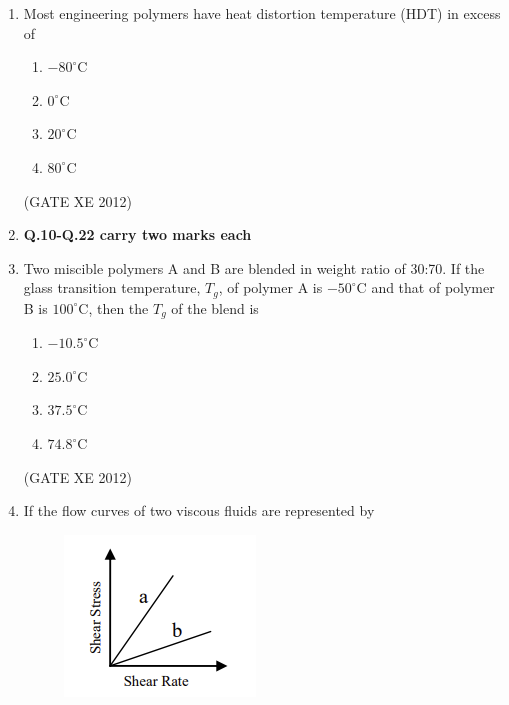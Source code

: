 \documentclass[12pt]{article}
\begin{document}
\begin{enumerate}
\item Most engineering polymers have heat distortion temperature (HDT) in excess of
\begin{multicols}{4}
\begin{enumerate}
\item $-80^\circ$C
\item $0^\circ$C
\item $20^\circ$C
\item $80^\circ$C
\end{enumerate}
\end{multicols}
(GATE XE 2012)

\item[] \textbf{Q.10-Q.22 carry two marks each}

\item Two miscible polymers A and B are blended in weight ratio of 30:70. If the glass transition temperature, $T_g$, of polymer A is $-50^\circ$C and that of polymer B is $100^\circ$C, then the $T_g$ of the blend is
\begin{multicols}{4}
\begin{enumerate}
\item $-10.5^\circ$C
\item $25.0^\circ$C
\item $37.5^\circ$C
\item $74.8^\circ$C
\end{enumerate}
\end{multicols}
(GATE XE 2012)


\item If the flow curves of two viscous fluids are represented by

\begin{figure}[H]
    \centering
    \includegraphics[width=0.5\columnwidth]{figs/ass2_f_q11.png}
    \caption{}
    \label{fig:placeholder}
\end{figure}


\end{enumerate}
\end{document}
